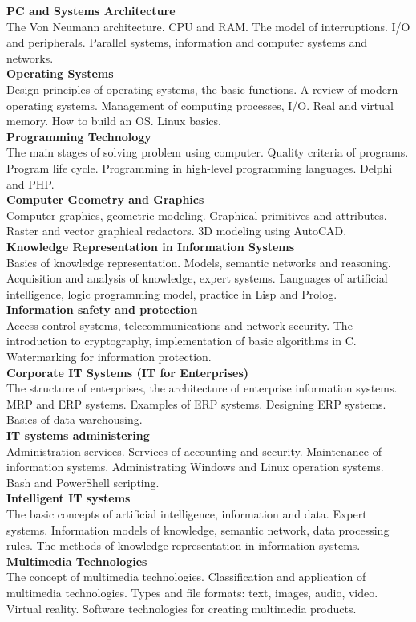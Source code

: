 \documentclass[a4paper, 12pt]{article}
\newcommand{\discipline}[1] {\textbf{#1} \\ }
\newcommand{\desc}[1] { #1 \\ }
\begin{document}
\discipline{PC and Systems Architecture}
\desc{The Von Neumann architecture. CPU and RAM. The model of interruptions. I/O and peripherals. Parallel systems, information and computer systems and networks.}

\discipline{Operating Systems}
\desc{Design principles of operating systems, the basic functions. A review of modern operating systems. Management of computing processes, I/O. Real and virtual memory. How to build an OS. Linux basics.}

\discipline{Programming Technology}
\desc{The main stages of solving problem using computer. Quality criteria of programs. Program life cycle. Programming in high-level programming languages. Delphi and PHP.}

\discipline{Computer Geometry and Graphics}
\desc{Computer graphics, geometric modeling. Graphical primitives and attributes. Raster and vector graphical redactors. 3D modeling using AutoCAD.}

\discipline{Knowledge Representation in Information Systems}
\desc{Basics of knowledge representation. Models, semantic networks and reasoning. Acquisition and analysis of knowledge, expert systems. Languages of artificial intelligence, logic programming model, practice in Lisp and Prolog.}

\discipline{Information safety and protection}
\desc{Access control systems, telecommunications and network security. The introduction to cryptography, implementation of basic algorithms in C. Watermarking for information protection.}

\discipline{Corporate IT Systems (IT for Enterprises)}
\desc{The structure of enterprises, the architecture of enterprise information systems. MRP and ERP systems. Examples of ERP systems. Designing ERP systems. Basics of data warehousing.}

\discipline{IT systems administering}
\desc{Administration services. Services of accounting and security. Maintenance of information systems. Administrating Windows and Linux operation systems. Bash and PowerShell scripting.}

\discipline{Intelligent IT systems}
\desc{The basic concepts of artificial intelligence, information and data. Expert systems. Information models of knowledge, semantic network, data processing rules. The methods of knowledge representation in information systems.}

\discipline{Multimedia Technologies}
\desc{The concept of multimedia technologies. Classification and application of multimedia technologies. Types and file formats: text, images, audio, video. Virtual reality. Software technologies for creating multimedia products.}
\end{document}
